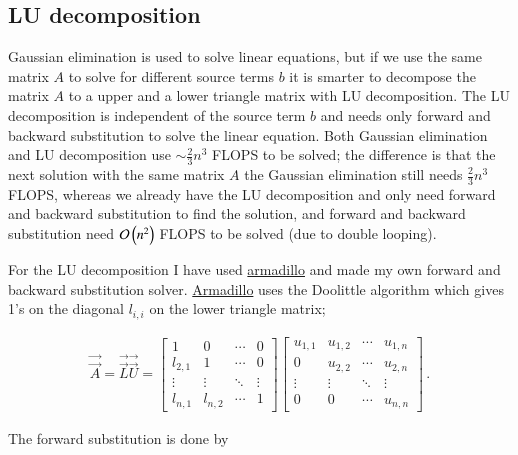 \documentclass[11pt,english,a4paper]{article}
\begin{document}
\begin{flushleft}
\subsection{LU decomposition} \label{sec_LU}

Gaussian elimination is used to solve linear equations, but if we use the same matrix $A$ to solve for different source terms $b$ it is smarter to decompose the matrix $A$ to a upper and a lower triangle matrix with LU decomposition. The LU decomposition is independent of the source term $b$ and needs only forward and backward substitution to solve the linear equation. Both Gaussian elimination and LU decomposition use $\sim\frac{2}{3}n^3$ FLOPS to be solved; the difference is that the next solution with the same matrix $A$ the Gaussian elimination still needs $\frac{2}{3}n^3$ FLOPS, whereas we already have the LU decomposition and only need forward and backward substitution to find the solution, and forward and backward substitution need $\mathcal{O}\left({n^2}\right)$ FLOPS to be solved (due to double looping). \linebreak

For the LU decomposition I have used \href{http://arma.sourceforge.net/}{armadillo} and made my own forward and backward substitution solver. \href{http://arma.sourceforge.net/}{Armadillo} uses the Doolittle algorithm which gives 1's on the diagonal $l_{i,i}$ on the lower triangle matrix;

\begin{align*}
\vec{\vec{A}} = \vec{\vec{L}}\vec{\vec{U}} = \begin{bmatrix} 1 & 0 & \cdots & 0 \\ l_{2,1} & 1 & \cdots & 0 \\ \vdots & \vdots & \ddots & \vdots \\ l_{n,1} & l_{n,2} & \cdots & 1 \end{bmatrix} \begin{bmatrix} u_{1,1} & u_{1,2} & \cdots & u_{1,n} \\ 0 & u_{2,2} & \cdots & u_{2,n} \\ \vdots & \vdots & \ddots & \vdots \\ 0 & 0 & \cdots & u_{n,n} \end{bmatrix} \,.
\end{align*}

The forward substitution is done by


\end{flushleft}
\end{document}
